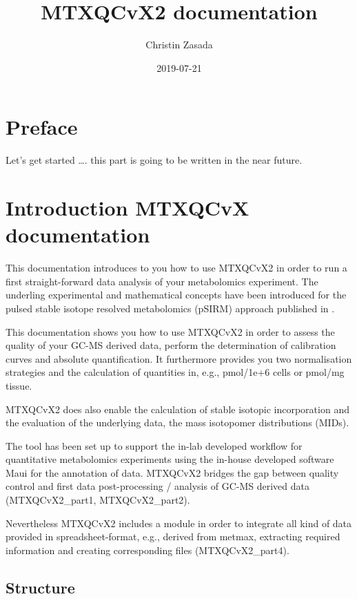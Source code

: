 \documentclass[]{book}
\title{MTXQCvX2 documentation}
\author{Christin Zasada}
\date{2019-07-21}
\begin{document}
\maketitle

{
\setcounter{tocdepth}{1}
\tableofcontents
}
\hypertarget{preface}{%
\chapter{Preface}\label{preface}}

Let's get started \ldots{}. this part is going to be written in the near future.

\hypertarget{intro}{%
\chapter{Introduction MTXQCvX documentation}\label{intro}}

This documentation introduces to you how to use MTXQCvX2 in order to run a first straight-forward data analysis of your metabolomics experiment. The underling experimental and mathematical concepts have been introduced for the pulsed stable isotope resolved metabolomics (pSIRM) approach published in \citep{Pietzke2014}.

This documentation shows you how to use MTXQCvX2 in order to assess the quality of your GC-MS derived data, perform the determination of calibration curves and absolute quantification. It furthermore provides you two normalisation strategies and the calculation of quantities in, e.g., pmol/1e+6 cells or pmol/mg tissue.

MTXQCvX2 does also enable the calculation of stable isotopic incorporation and the evaluation of the underlying data, the mass isotopomer distributions (MIDs).

The tool has been set up to support the in-lab developed workflow for quantitative metabolomics experiments using the in-house developed software Maui for the annotation of data. MTXQCvX2 bridges the gap between quality control and first data post-processing / analysis of GC-MS derived data (MTXQCvX2\_part1, MTXQCvX2\_part2).

Nevertheless MTXQCvX2 includes a module in order to integrate all kind of data provided in spreadsheet-format, e.g., derived from metmax, extracting required information and creating corresponding files (MTXQCvX2\_part4).

\hypertarget{structure}{%
\section{Structure}\label{structure}}
\end{document}
